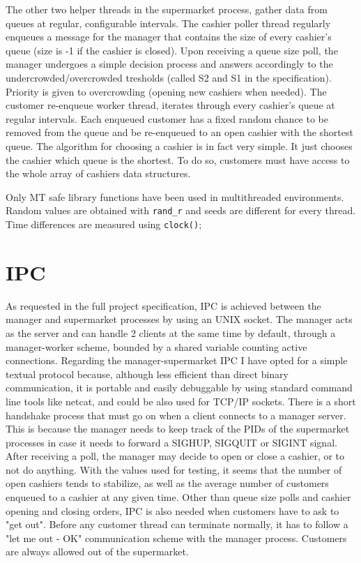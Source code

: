 \documentclass{article}
\begin{document}
    The other two helper threads in the supermarket process,
    gather data from queues at regular, configurable intervals.
    The cashier poller thread regularly
    enqueues a message for the manager that contains the size of every cashier's queue (size is -1 if
    the cashier is closed).
    Upon receiving a queue size poll, the manager undergoes a simple decision process
    and answers accordingly to the undercrowded/overcrowded tresholds (called S2 and S1
    in the specification).
    Priority is given to overcrowding (opening new cashiers when needed).
    The customer re-enqueue worker thread, iterates through every cashier's queue
    at regular intervals. Each enqueued customer has a fixed random chance to be
    removed from the queue and be re-enqueued to an open cashier with the shortest
    queue.
    The algorithm for choosing a cashier is in fact very simple. It just chooses
    the cashier which queue is the shortest. To do so, customers must have
    access to the whole array of cashiers data structures.

    Only MT safe library functions have been used in multithreaded environments.
    Random values are obtained with \texttt{rand\_r} and seeds are different for
    every thread. Time differences are measured using \texttt{clock()};
    
    \section{IPC}
    As requested in the full project specification, IPC is achieved between the
    manager and supermarket processes by using an UNIX socket. The manager acts as
    the server and can handle 2 clients at the same time by default, through a
    manager-worker scheme, bounded by a shared variable counting active connections.
    Regarding the manager-supermarket IPC I have opted for a simple textual protocol
    because, although less efficient than direct binary communication, it is
    portable and easily debuggable by using standard command line tools like
    netcat, and could be also used for TCP/IP sockets. There is a short handshake
    process that must go on when a client connects to a manager server.
    This is because the manager needs to keep track of the PIDs of the supermarket
    processes in case it needs to forward a SIGHUP, SIGQUIT or SIGINT signal.
    After receiving a poll, the manager may decide to open or close a cashier, or to
    not do anything.
    With the values used for testing, it seems that the number of open cashiers tends
    to stabilize, as well as the average number of customers enqueued to a cashier
    at any given time. Other than queue size polls and cashier opening and closing
    orders, IPC is also needed when customers have to ask to "get out".
    Before any customer thread can terminate normally, it has to follow a
    "let me out - OK" communication scheme with the manager process.
    Customers are always allowed out of the supermarket.
        
\end{document}
